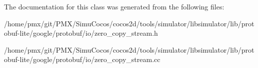 The documentation for this class was generated from the following files\+:\begin{DoxyCompactItemize}
\item 
/home/pmx/git/\+P\+M\+X/\+Simu\+Cocos/cocos2d/tools/simulator/libsimulator/lib/protobuf-\/lite/google/protobuf/io/zero\+\_\+copy\+\_\+stream.\+h\item 
/home/pmx/git/\+P\+M\+X/\+Simu\+Cocos/cocos2d/tools/simulator/libsimulator/lib/protobuf-\/lite/google/protobuf/io/zero\+\_\+copy\+\_\+stream.\+cc\end{DoxyCompactItemize}
